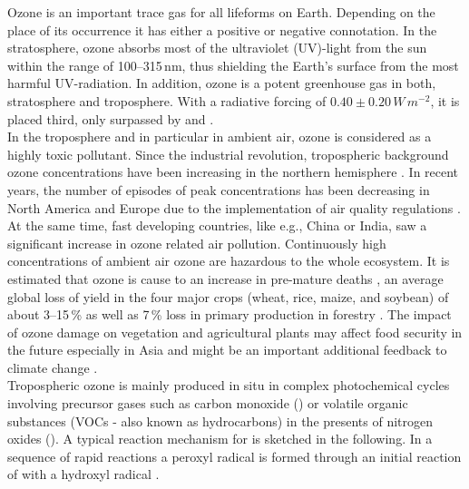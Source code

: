 \documentclass[gmd, manuscript]{copernicus}
\begin{document}
\introduction  %
Ozone is an important trace gas for all lifeforms on Earth. Depending on the place of its occurrence it has either a positive or negative connotation. In the stratosphere, ozone absorbs most of the ultraviolet (UV)-light from the sun within the range of 100--315\,\unit{nm}, thus shielding the Earth's surface from the most harmful UV-radiation. In addition, ozone is a potent greenhouse gas in both, stratosphere and troposphere. With a radiative forcing of $0.40 \pm 0.20\,\unit{W\,m^{-2}}$, it is placed third, only surpassed by  and  \citep[Chapter 8]{IPCC2013}.\\
In the troposphere and in particular in ambient air, ozone is considered as a highly toxic pollutant. Since the industrial revolution, tropospheric background ozone concentrations have been increasing in the northern hemisphere \citep[Chapter 2]{IPCC2013}. In recent years, the number of episodes of peak concentrations has been decreasing in North America and Europe due to the implementation of air quality regulations \citep[e.g.,][]{ACP:Wilson2012}. At the same time, fast developing countries, like e.g., China or India, saw a significant increase in ozone related air pollution. Continuously high concentrations of ambient air ozone are hazardous to the whole ecosystem. It is estimated that ozone is cause to an increase in pre-mature deaths \citep{WHO2008}, an average global loss of yield in the four major crops (wheat, rice, maize, and soybean) of about 3--15\,\unit{\%} \citep{PJ:Ainsworth2017} as well as 7\,\unit{\%} loss in primary production in forestry \citep{GCB:Wittig2009,EP:Matyssek2012}. The impact of ozone damage on vegetation and agricultural plants may affect food security in the future especially in Asia \citep{GCB:Tang2013,NCC:Tai2014,AE:Chuwah2015} and might be an important additional feedback to climate change \citep{Nat:Sitch2007}.\\
Tropospheric ozone is mainly produced in situ in complex photochemical cycles involving precursor gases such as carbon monoxide () or volatile organic substances (VOCs - also known as hydrocarbons) in the presents of nitrogen oxides (). A typical reaction mechanism for  is sketched in the following. In a sequence of rapid reactions a peroxyl radical  is formed through an initial reaction of  with a hydroxyl radical .
\end{document}
